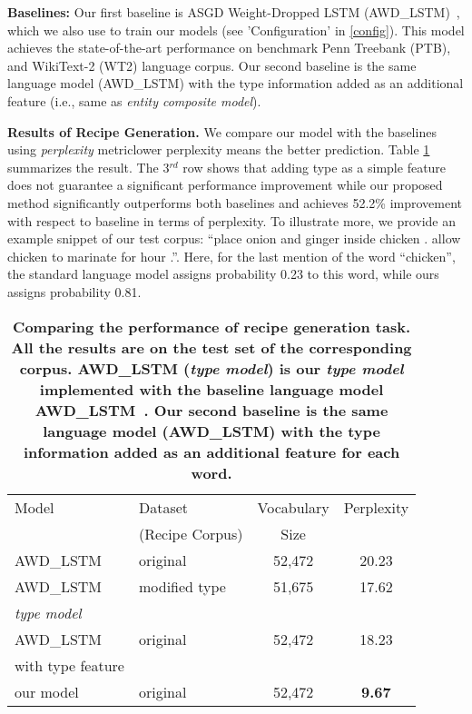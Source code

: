 \documentclass[11pt,a4paper]{article}
\begin{document}
\textbf{Baselines:} Our first baseline is ASGD Weight-Dropped LSTM (AWD\_LSTM)~\cite{socher}, which we also use to train our models (see 'Configuration' in \ref{config}). This model achieves the state-of-the-art performance on benchmark Penn Treebank (PTB), and WikiText-2 (WT2) language corpus. 
Our second baseline is the same language model (AWD\_LSTM) with the type information added as an additional feature (i.e., same as {\it entity composite model}). 



\textbf{Results of Recipe Generation.} We compare our model with the baselines using {\em perplexity} metric\textemdash lower perplexity means the better prediction.  Table \ref{rcp_ppl_table} summarizes the result. The 3$^{rd}$ row shows that adding type as a simple feature does not guarantee  a significant performance improvement while our proposed method significantly outperforms both baselines and achieves 52.2\% improvement with respect to  baseline in terms of perplexity. To illustrate more, we provide an example snippet of our test corpus:
``place onion and ginger inside chicken  . allow chicken to marinate for hour  .''. Here, for the last mention of the word ``chicken'', the standard language model assigns probability 0.23 to this word, while ours assigns probability 0.81. 


\begin{table}
\scriptsize
\centering

 \begin{tabular}{l| l| c |  c} 
 \toprule
 Model & Dataset  & Vocabulary & Perplexity   \\ 
       & (Recipe Corpus)  & Size &    \\ 
 \midrule
  AWD\_LSTM & original  & 52,472  & 20.23 \\
   \midrule
  AWD\_LSTM  & modified type  &  51,675 & 17.62 \\
  \textit{type model} & & & \\
   \midrule
AWD\_LSTM  & original  &  52,472 & 18.23\\
   with type feature & & & \\
    \midrule
 our model  & original  &  52,472 &  \textbf{9.67} \\
 \bottomrule
 \end{tabular}
 \caption{\textbf{\small Comparing the performance of recipe generation task. All the results are on the test set of the corresponding corpus. AWD\_LSTM (\textit{type model}) is our \textit{type model} implemented with the baseline language model AWD\_LSTM~\cite{socher}. Our second baseline is the same language model (AWD\_LSTM) with the type information added as an additional feature for each word.}}


 \label{rcp_ppl_table}
\end{table}
\end{document}
